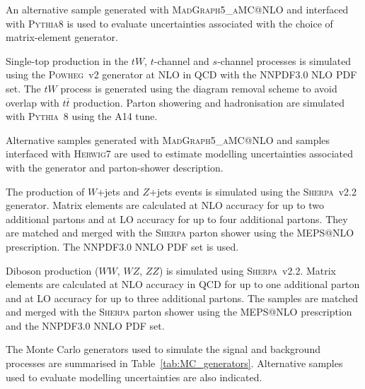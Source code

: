 \begin{description}
An alternative sample generated with
\textsc{MadGraph5\_aMC@NLO} and interfaced with
\textsc{Pythia8} is used to evaluate uncertainties
associated with the choice of matrix-element generator.

\item[Single-top:]

Single-top production in the $tW$, $t$-channel and $s$-channel
processes is simulated using the \textsc{Powheg}~v2 generator
at NLO in QCD with the NNPDF3.0 NLO PDF set.
The $tW$ process is generated using the diagram removal scheme
to avoid overlap with $t\bar{t}$ production.
Parton showering and hadronisation are simulated with
\textsc{Pythia}~8 using the A14 tune.

Alternative samples generated with
\textsc{MadGraph5\_aMC@NLO} and samples interfaced
with \textsc{Herwig7} are used to estimate modelling
uncertainties associated with the generator and
parton-shower description.

\item[\boldmath$V$+jets:]

The production of $W$+jets and $Z$+jets events is simulated
using the \textsc{Sherpa}~v2.2 generator.
Matrix elements are calculated at NLO accuracy for up to two
additional partons and at LO accuracy for up to four additional
partons.
They are matched and merged with the \textsc{Sherpa} parton
shower using the MEPS@NLO prescription.
The NNPDF3.0 NNLO PDF set is used.

\item[\boldmath$VV$:]

Diboson production ($WW$, $WZ$, $ZZ$) is simulated using
\textsc{Sherpa}~v2.2.
Matrix elements are calculated at NLO accuracy in QCD
for up to one additional parton and at LO accuracy for up to
three additional partons.
The samples are matched and merged with the
\textsc{Sherpa} parton shower using the MEPS@NLO prescription
and the NNPDF3.0 NNLO PDF set.

\end{description}

The Monte Carlo generators used to simulate the signal and background
processes are summarised in Table~\ref{tab:MC_generators}.
Alternative samples used to evaluate modelling uncertainties
are also indicated.

